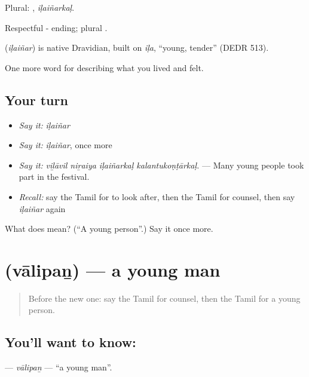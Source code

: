 Plural: , \emph{iḷaiñarkaḷ}.

Respectful - ending; plural .

\begin{cousinweb}
\textbf{} (\emph{iḷaiñar}) is native Dravidian, built on  \emph{iḷa}, \textquotedblleft{}young, tender\textquotedblright{} (DEDR 513).
\end{cousinweb}

\begin{grammarlens}[title={What you've built}]
One more word for describing what you lived and felt.
\end{grammarlens}

\subsection*{Your turn}
\begin{itemize}
\raggedright
  \item \emph{Say it:} \emph{iḷaiñar}
  \item \emph{Say it:} \emph{iḷaiñar}, once more
  \item \emph{Say it:} \emph{viḻāvil niṟaiya iḷaiñarkaḷ kalantukoṇṭārkaḷ.} — Many young people took part in the festival.
  \item \emph{Recall:} say the Tamil for to look after, then the Tamil for counsel, then say \emph{iḷaiñar} again
\end{itemize}

\begin{tcolorbox}[breakable,colback=teal!4,colframe=teal!35!black,title={Before you move on}]
What does  mean? (\textquotedblleft{}A young person\textquotedblright{}.) Say it once more.
\end{tcolorbox}
\section[\texorpdfstring{\ta{வாலிபன்} (vālipaṉ)}{வாலிபன் (vālipaṉ)}]{ (vālipaṉ) — a young man}

\label{lesson:TA-C498-valipan}



\begin{quote}
Before the new one: say the Tamil for counsel, then the Tamil for a young person.
\end{quote}

\subsection*{You'll want to know: }
\textbf{} — \emph{vālipaṉ} — \textquotedblleft{}a young man\textquotedblright{}.

